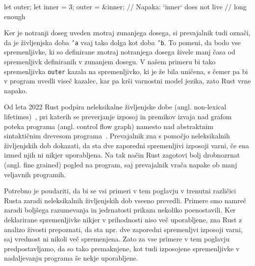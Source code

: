\begin{rust-failure}
let outer;
{
    let inner = 3;
    outer = &inner;  // Napaka: `inner` does not live
                     // long enough
}
\end{rust-failure}

Ker je notranji doseg uveden znotraj zunanjega dosega, si prevajalnik tudi označi, da je življenjska doba \texttt{'a} vsaj tako dolga kot doba \texttt{'b}. To pomeni, da bodo vse spremenljivke, ki so definirane znotraj notranjega dosega živele manj časa od spremenljivk definiranih v zunanjem dosegu. V našem primeru bi tako spremenljivka \texttt{outer} kazala na spremenljivko, ki je že bila uničena, s čemer pa bi v program uvedli viseč kazalec, kar pa krši varnostni model jezika, zato Rust vrne napako.


Od leta 2022 Rust podpira neleksikalne življenjske dobe (angl. non-lexical lifetimes)~\cite{Matsakis_2018, Matsakis_et_al_2022}, pri katerih se preverjanje izposoj in premikov izvaja nad grafom poteka programa (angl. control flow graph) namesto nad abstraktnim sintaktičnim drevesom programa~\cite{weiss2021oxide, StackedBorrows}. Prevajalnik zna s pomočjo neleksikalnih življenjskih dob dokazati, da sta dve zaporedni spremenljivi izposoji varni, če ena izmed njih ni nikjer uporabljena. Na tak način Rust zagotovi bolj drobnozrnat (angl. fine grained) pogled na program, saj prevajalnik vrača napake ob manj veljavnih programih.

Potrebno je poudariti, da bi se vsi primeri v tem poglavju v trenutni različici Rusta zaradi neleksikalnih življenjskih dob vseeno prevedli. Primere smo namreč zaradi boljšega razumevanja in jedrnatosti prikaza nekoliko poenostavili. Ker deklarirane spremenljivke nikjer v prihodnosti niso več uporabljene, zna Rust z analizo živosti prepoznati, da sta npr. dve zaporedni spremenljvi izposoji varni, saj vrednost ni nikoli več spremenjena. Zato za vse primere v tem poglavju predpostavljamo, da so tako premaknjene, kot tudi izposojene spremenljivke v nadaljevanju programa še nekje uporabljene.

